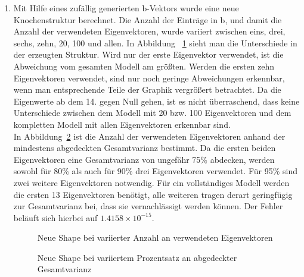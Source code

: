 \documentclass[]{report}
\newlength\figureheight
\newlength\figurewidth
\begin{document}
\begin{enumerate}
\begin{enumerate}
			\item
			Mit Hilfe eines zufällig generierten b-Vektors wurde eine neue Knochenstruktur berechnet. Die Anzahl der Einträge in b, und damit die Anzahl der verwendeten Eigenvektoren, wurde variiert zwischen eins, drei, sechs, zehn, 20, 100 und allen. In Abbildung ~\ref{fig:shapesK} sieht man die Unterschiede in der erzeugten Struktur. Wird nur der erste Eigenvektor verwendet, ist die Abweichung vom gesamten Modell am größten. Werden die ersten zehn Eigenvektoren verwendet, sind nur noch geringe Abweichungen erkennbar, wenn man entsprechende Teile der Graphik vergrößert betrachtet. Da die Eigenwerte ab dem 14. gegen Null gehen, ist es nicht überraschend, dass keine Unterschiede zwischen dem Modell mit 20 bzw. 100 Eigenvektoren und dem kompletten Modell mit allen Eigenvektoren erkennbar sind.\\
			In Abbildung~\ref{fig:shapesVar} ist die Anzahl der verwendeten Eigenvektoren anhand der mindestens abgedeckten Gesamtvarianz bestimmt. Da die ersten beiden Eigenvektoren eine Gesamtvarianz von  ungefähr 75\% abdecken, werden sowohl für 80\% als auch für 90\% drei Eigenvektoren verwendet. Für 95\% sind zwei weitere Eigenvektoren notwendig. Für ein vollständiges Modell werden die ersten 13 Eigenvektoren benötigt, alle weiteren tragen derart geringfügig zur Gesamtvarianz bei, dass sie vernachlässigt werden können. Der Fehler beläuft sich hierbei auf $1.4158\times 10^{-15}$.
			\setlength\figureheight{5cm}
			\setlength{}
			\begin{figure}
				\centering
				
				\caption{Neue Shape bei variierter Anzahl an verwendeten Eigenvektoren}
				\label{fig:shapesK}
			\end{figure}
			\qquad
			\begin{figure}
				\centering
				
				\caption{Neue Shape bei variiertem Prozentsatz an abgedeckter Gesamtvarianz}
				\label{fig:shapesVar}
			\end{figure}
		\end{enumerate}
	\end{enumerate}
	
\end{document}
